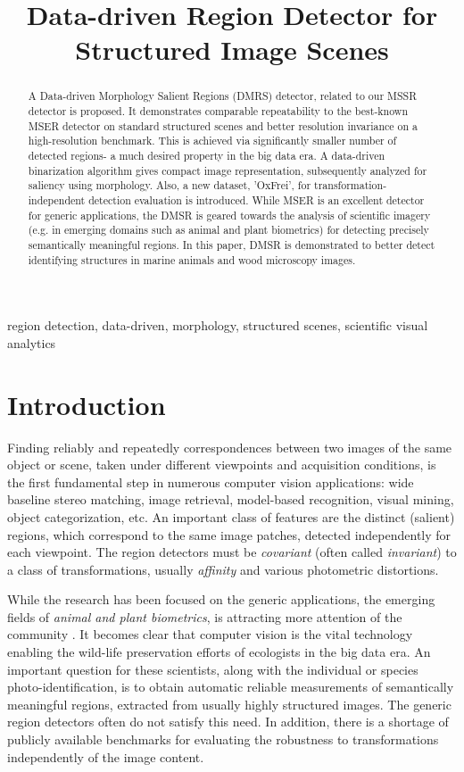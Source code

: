 \documentclass{article}
\title{Data-driven Region Detector for Structured Image Scenes}
\begin{document}
%
\maketitle
%
\begin{abstract}
A Data-driven Morphology Salient Regions (DMRS) detector, related to our MSSR detector is proposed.
It demonstrates comparable repeatability to the best-known MSER detector on standard structured scenes and better resolution invariance on a high-resolution benchmark. This is achieved via significantly smaller number of detected regions- a much desired property in the big data era. A data-driven binarization algorithm gives compact image representation, subsequently analyzed for saliency using morphology.  Also, a new dataset, 'OxFrei', for transformation-independent detection evaluation is introduced.
While MSER is an excellent detector for generic applications, the DMSR is geared towards the analysis of scientific imagery (e.g.  in emerging domains such as animal and plant biometrics) for detecting precisely semantically meaningful regions. In this paper, DMSR is demonstrated to better detect identifying structures in marine animals and wood microscopy images.

\end{abstract}
%
\begin{keywords}
region detection, data-driven, morphology, structured scenes, scientific visual analytics
\end{keywords}
%
\section{Introduction}
\label{sec:intro}
Finding reliably and repeatedly correspondences between two images of the same object or scene, taken under different viewpoints and acquisition conditions, is the first fundamental step in numerous computer vision applications: wide baseline stereo matching, image retrieval, model-based recognition, visual mining, object categorization, etc. An important class of features are the distinct (salient) regions, which correspond to the same image patches, detected independently for each viewpoint. The region detectors must be {\em covariant} (often called {\em invariant}) to a class of transformations, usually {\em affinity} and various photometric distortions. 

While the research has been focused on the generic applications, the emerging fields of {\em animal and plant biometrics}, is attracting more attention of the community \cite{Kuehl2013, leafsnap_eccv2012}. It becomes clear that computer vision is the vital technology enabling the wild-life preservation efforts of ecologists in the big data era. An important question for these scientists, along with the individual or species photo-identification, is to obtain automatic reliable measurements of semantically meaningful regions, extracted from usually highly structured images. The generic region detectors often do not satisfy this need. In addition, there is a shortage of publicly available benchmarks for evaluating the robustness to transformations independently of the image content.
\end{document}
